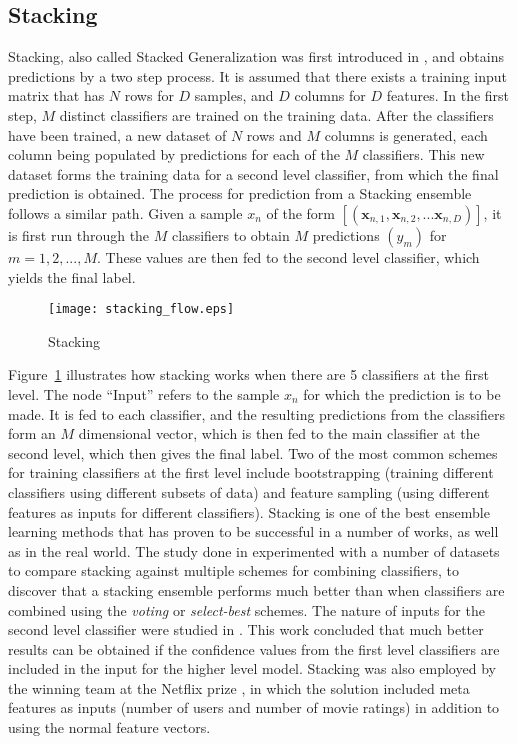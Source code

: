 \subsection{Stacking}
Stacking, also called Stacked Generalization was first introduced in \cite{wolpert1992stacked}, and obtains predictions by a two step process. It is assumed that there exists a training input matrix that has $N$ rows for $D$ samples, and $D$ columns for $D$ features. In the first step, $M$ distinct classifiers are trained on the training data. After the classifiers have been trained, a new dataset of $N$ rows and $M$ columns is generated, each column being populated by predictions for each of the $M$ classifiers. This new dataset forms the training data for a second level classifier, from which the final prediction is obtained. The process for prediction from a Stacking ensemble follows a similar path. Given a sample $x_n$ of the form $[(\mathbf{x}_{n, 1}, \mathbf{x}_{n, 2}, ... \mathbf{x}_{n, D})]$, it is first run through the $M$ classifiers to obtain $M$ predictions $(y_m)$ for $m = 1, 2, ..., M$. These values are then fed to the second level classifier, which yields the final label.\\

\begin{figure}
    \centering
    \texttt{[image: stacking\_flow.eps]}
    \caption{Stacking}
    \label{fig:stacking_flow}
\end{figure}

Figure~\ref{fig:stacking_flow} illustrates how stacking works when there are 5 classifiers at the first level. The node ``Input'' refers to the sample $x_n$ for which the prediction is to be made. It is fed to each classifier, and the resulting predictions from the classifiers form an $M$ dimensional vector, which is then fed to the main classifier at the second level, which then gives the final label. Two of the most common schemes for training classifiers at the first level include bootstrapping (training different classifiers using different subsets of data) and feature sampling (using different features as inputs for different classifiers). Stacking is one of the best ensemble learning methods that has proven to be successful in a number of works, as well as in the real world. The study done in \cite{dvzeroski2004combining} experimented with a number of datasets to compare stacking against multiple schemes for combining classifiers, to discover that a stacking ensemble performs much better than when classifiers are combined using the \emph{voting} or \emph{select-best} schemes. The nature of inputs for the second level classifier were studied in \cite{ting2011issues}. This work concluded that much better results can be obtained if the confidence values from the first level classifiers are included in the input for the higher level model. Stacking was also employed by the winning team at the Netflix prize \cite{koren2009bellkor}, in which the solution included meta features as inputs (number of users and number of movie ratings) in addition to using the normal feature vectors.
